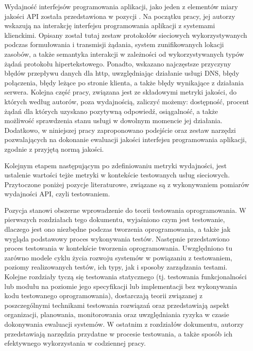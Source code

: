 Wydajność interfejsów programowania aplikacji, jako jeden z elementów miary jakości API została przedstawiona w pozycji \cite{bermbach2016benchmarking}. Na początku pracy, jej autorzy wskazują na interakcję interfejsu programowania aplikacji z systemami klienckimi. Opisany został tutaj zestaw protokołów sieciowych wykorzystywanych podczas formułowania i transmisji żądania, system zunifikowanych lokacji zasobów, a także semantyka interakcji w zależności od wykorzystywanych typów żądań protokołu hipertekstowego. Ponadto, wskazano najczęstsze przyczyny błędów przepływu danych dla http, uwzględniając działanie usługi DNS, błędy połączenia, błędy leżące po stronie klienta, a także błędy wynikające z działania serwera. Kolejna część pracy, związana jest ze składowymi metryki jakości, do których według autorów, poza wydajnością, zaliczyć możemy: dostępność, procent żądań dla których uzyskano pozytywną odpowiedź, osiągalność, a także możliwość sprawdzenia stanu usługi w dowolnym momencie jej działania. Dodatkowo, w niniejszej pracy zaproponowano podejście oraz zestaw narzędzi pozwalających na dokonanie ewaluacji jakości interfejsu programowania aplikacji, zgodnie z przyjętą normą jakości.

Kolejnym etapem następującym po zdefiniowaniu metryki wydajności, jest ustalenie wartości tejże metryki w kontekście testowanych usług sieciowych. Przytoczone poniżej pozycje literaturowe, związane są z wykonywaniem pomiarów wydajności API, czyli testowaniem.

Pozycja \cite{spillner2021software} stanowi obszerne wprowadzenie do teorii testowania oprogramowania. W pierwszych rozdziałach tego dokumentu, wyjaśniono czym jest testowanie, dlaczego jest ono niezbędne podczas tworzenia oprogramowania, a także jak wygląda podstawowy proces wykonywania testów. Następnie przedstawiono proces testowania w kontekście tworzenia oprogramowania. Uwzględniono tu zarówno modele cyklu życia rozwoju systemów w powiązaniu z testowaniem, poziomy realizowanych testów, ich typy, jak i sposoby zarządzania testami. Kolejne rozdziały tyczą się testowania statycznego (tj. testowania funkcjonalności lub modułu na poziomie jego specyfikacji lub implementacji bez wykonywania kodu testowanego oprogramowania), dostarczają teorii związanej z poszczególnymi technikami testowania rozwiązań oraz przedstawiają aspekt organizacji, planowania, monitorowania oraz uwzględniania ryzyka w czasie dokonywania ewaluacji systemów. W ostatnim z rozdziałów dokumentu, autorzy przedstawiają narzędzia przydatne w procesie testowania, a także sposób ich efektywnego wykorzystania w codziennej pracy.

